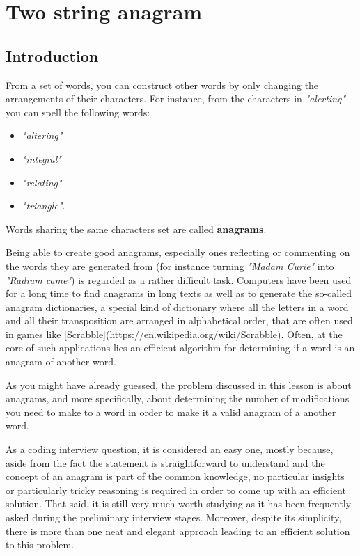 %


\chapter{Two string anagram}
\label{ch:two_string_anagram}
\section*{Introduction}
From a set of words, you can construct other words by only changing the arrangements of their characters.
For instance, from the characters in \textit{"alerting"} you can spell the following words:
\begin{itemize}
	\item  \textit{"altering"}
	\item  \textit{"integral"}
	\item  \textit{"relating"}
	\item  \textit{"triangle"}.
\end{itemize}
Words sharing the same characters set are called \textbf{anagrams}. 

Being able to create good anagrams,
especially ones reflecting or commenting on the words they are generated from (for instance turning
\textit{"Madam Curie"} into \textit{"Radium came"}) is regarded as a rather difficult task.
Computers have been used for a long time to find anagrams in long texts as well as to generate the so-called anagram dictionaries,  a special kind of dictionary where all the letters in a word and
all their transposition are arranged in alphabetical order, that are often used in games like
[Scrabble](https://en.wikipedia.org/wiki/Scrabble). Often, at the core of such applications lies an efficient algorithm for determining if a word is an anagram of another word.

As you might have already guessed, the problem discussed in this lesson is about anagrams, and more specifically, about determining the number of
modifications you need to make to a word in order to make it a valid anagram of a
another word.

As a coding interview question, it is considered an easy one, mostly because, aside from the fact the statement is straightforward to
understand and the concept of an anagram is part of the common knowledge, no particular insights or particularly
tricky reasoning is required in order to come up with an efficient solution. 
That said, it is still very much worth studying as it has been frequently asked during the preliminary interview stages.
Moreover, despite its simplicity, there is more than one neat and elegant approach leading to an efficient
solution to this problem.

